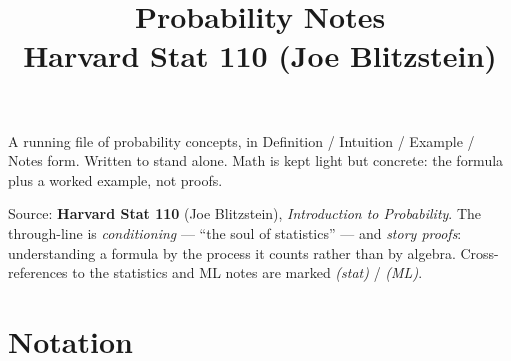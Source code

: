 \documentclass[11pt,a4paper]{article}
\title{Probability Notes\\[0.3em]\large Harvard Stat 110 (Joe Blitzstein)}
\author{}
\date{}
\begin{document}
\maketitle
\tableofcontents
\newpage

A running file of probability concepts, in Definition / Intuition / Example / Notes form. Written to stand alone. Math is kept light but concrete: the formula plus a worked example, not proofs.

Source: \textbf{Harvard Stat 110} (Joe Blitzstein), \textit{Introduction to Probability}. The through-line is \textit{conditioning} --- ``the soul of statistics'' --- and \textit{story proofs}: understanding a formula by the process it counts rather than by algebra. Cross-references to the statistics and ML notes are marked \textit{(stat)} / \textit{(ML)}.

\section*{Notation}
\small
\end{document}
